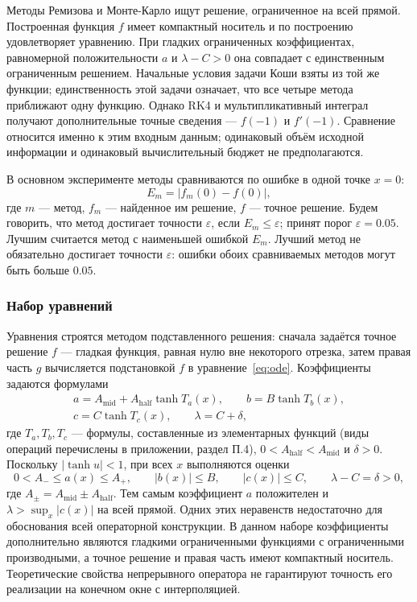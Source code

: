 \documentclass[14pt,a4paper]{extarticle}
\begin{document}
Методы Ремизова и Монте-Карло ищут решение, ограниченное на всей
прямой. Построенная функция $f$ имеет компактный носитель и по
построению удовлетворяет уравнению. При гладких ограниченных
коэффициентах, равномерной положительности $a$ и $\lambda-C>0$
она совпадает с единственным ограниченным решением. Начальные условия
задачи Коши взяты из той же функции; единственность этой задачи
означает, что все четыре метода приближают одну функцию.
Однако RK4 и мультипликативный интеграл получают дополнительные
точные сведения --- $f(-1)$ и $f'(-1)$. Сравнение относится именно
к этим входным данным; одинаковый объём исходной информации
и одинаковый вычислительный бюджет не предполагаются.

В основном эксперименте методы сравниваются по ошибке в одной точке $x=0$:
\begin{equation}\label{eq:ml-error}
E_m=\bigl|f_m(0)-f(0)\bigr|,
\end{equation}
где $m$ --- метод, $f_m$ --- найденное им решение, $f$ --- точное
решение. Будем говорить, что метод достигает точности $\varepsilon$,
если $E_m\le\varepsilon$; принят порог $\varepsilon=0.05$. Лучшим считается
метод с наименьшей ошибкой $E_m$. Лучший метод не обязательно достигает
точности $\varepsilon$: ошибки обоих сравниваемых методов могут быть
больше $0.05$.

\subsubsection{Набор уравнений}
Уравнения строятся методом подставленного решения: сначала задаётся
точное решение $f$ --- гладкая функция, равная нулю вне некоторого
отрезка, затем правая часть $g$ вычисляется подстановкой $f$
в уравнение~\eqref{eq:ode}. Коэффициенты задаются формулами
\begin{equation}\label{eq:ml-coef}
\begin{gathered}
a=A_{\mathrm{mid}}+A_{\mathrm{half}}\tanh T_a(x),\qquad
b=B\tanh T_b(x),\\
c=C\tanh T_c(x),\qquad
\lambda=C+\delta,
\end{gathered}
\end{equation}
где $T_a,T_b,T_c$ --- формулы, составленные из элементарных функций
(виды операций перечислены в приложении, раздел П.4),
$0<A_{\mathrm{half}}<A_{\mathrm{mid}}$ и $\delta>0$. Поскольку
$|\tanh u|<1$, при всех $x$ выполняются оценки
\[
0<A_-\le a(x)\le A_+,\qquad |b(x)|\le B,\qquad |c(x)|\le C,\qquad
\lambda-C=\delta>0,
\]
где $A_\pm=A_{\mathrm{mid}}\pm A_{\mathrm{half}}$. Тем самым коэффициент
$a$ положителен и $\lambda>\sup_x|c(x)|$ на всей прямой.
Одних этих неравенств недостаточно для обоснования всей операторной
конструкции. В данном наборе коэффициенты дополнительно являются
гладкими ограниченными функциями с ограниченными производными,
а точное решение и правая часть имеют компактный носитель.
Теоретические свойства непрерывного оператора не гарантируют
точность его реализации на конечном окне с интерполяцией.
\end{document}
